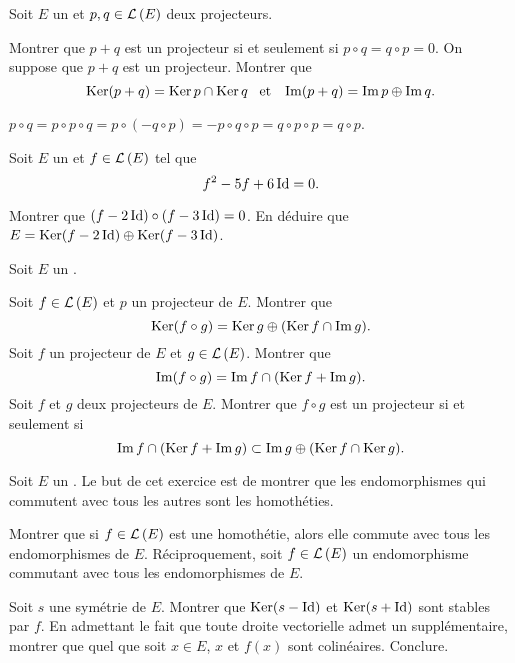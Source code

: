 \documentclass{magnolia}
\begin{document}

Soit $E$ un \Kev et $p,q\in\mathcal{L}\left(E\right)$ deux projecteurs.
\begin{questions}
\question Montrer que $p+q$ est un projecteur si et seulement si
  $p\circ q=q\circ p=0$.
\question On suppose que $p+q$ est un projecteur. Montrer que
  \[\mathop{\rm Ker}(p+q)=\mathop{\rm Ker} p\cap\mathop{\rm Ker} q \quad\!\text{et}\quad\! \operatorname{Im}(p+q)=\operatorname{Im} p\oplus\operatorname{Im} q.\]
\end{questions}

\begin{sol}
$p\circ q=p\circ p\circ q=p\circ(-q\circ p)=-p\circ q\circ p=q\circ p\circ p=q\circ p$.
\end{sol}


Soit $E$ un \Kev et $f\in\mathcal{L}\left(E\right)$ tel que
\[f^2-5f+6\operatorname{Id}=0.\]
\begin{questions}
\question Montrer que $(f-2\operatorname{Id})\circ(f-3\operatorname{Id})=0$.
\question En déduire que $E=\mathop{\rm Ker} (f-2\operatorname{Id})\oplus\mathop{\rm Ker} (f-3\operatorname{Id})$.
\end{questions}

Soit $E$ un \Kev.
\begin{questions}
\question Soit $f\in\mathcal{L}\left(E\right)$ et $p$ un projecteur de $E$. Montrer que
  \[\mathop{\rm Ker}(f\circ g)=\mathop{\rm Ker} g \oplus (\mathop{\rm Ker} f\cap\operatorname{Im} g).\]
\question Soit $f$ un projecteur de $E$ et $g\in\mathcal{L}\left(E\right)$. Montrer que
  \[\operatorname{Im}(f\circ g)=\operatorname{Im} f \cap (\mathop{\rm Ker} f + \operatorname{Im} g).\]
\question Soit $f$ et $g$ deux projecteurs de $E$. Montrer que $f\circ g$ est
  un projecteur si et seulement si
  \[\operatorname{Im} f \cap (\mathop{\rm Ker} f + \operatorname{Im} g)\subset \operatorname{Im} g \oplus (\mathop{\rm Ker} f \cap \mathop{\rm Ker} g).\]
\end{questions}



Soit $E$ un \Kev. Le but de cet exercice est de montrer que les endomorphismes qui commutent avec tous les
autres sont les homothéties.
\begin{questions}
\question Montrer que si $f\in\mathcal{L}\left(E\right)$ est une homothétie, alors elle commute avec tous les
  endomorphismes de $E$.
\question Réciproquement, soit $f\in\mathcal{L}\left(E\right)$ un endomorphisme commutant avec tous les endomorphismes
  de $E$.
  \begin{questions}
  \question Soit $s$ une symétrie de $E$. Montrer que $\mathop{\rm Ker}(s-\operatorname{Id})$ et $\mathop{\rm Ker}(s+\operatorname{Id})$ sont stables par $f$.
  \question En admettant le fait que toute droite vectorielle admet un supplémentaire, montrer que
    quel que soit $x\in E$, $x$ et $f(x)$ sont colinéaires.
  \question Conclure.
  \end{questions}
\end{questions}
\end{document}
